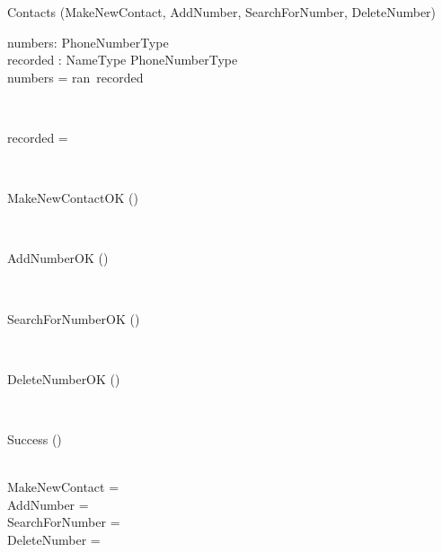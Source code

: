 \begin{class}{Contacts}
\also
\upharpoonright (MakeNewContact, AddNumber, SearchForNumber, DeleteNumber) \\
\begin{state}
numbers:  PhoneNumberType\\
recorded : NameType \pfun PhoneNumberType\\
\where
numbers = ran~recorded
\end{state} \\
\begin{init}
recorded = \emptyset %
\end{init} \\
\begin{op}{MakeNewContactOK}
\Delta () \\
\ST
\end{op}\\
\begin{op}{AddNumberOK}
\Delta () \\
\ST
\end{op}\\
\begin{op}{SearchForNumberOK}
\Delta () \\
\ST
\end{op}\\
\begin{op}{DeleteNumberOK}
\Delta () \\
\ST
\end{op}\\
\begin{op}{Success}
\Delta () \\
\ST
\end{op}\\ %
\also
MakeNewContact =\\
AddNumber = \\
SearchForNumber = \\
DeleteNumber =
\end{class}